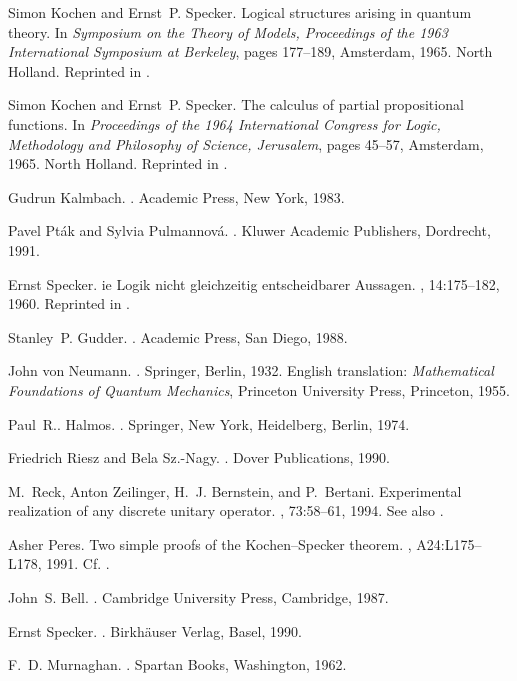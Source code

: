 \begin{thebibliography}{10}
Simon Kochen and Ernst~P. Specker.
\newblock Logical structures arising in quantum theory.
\newblock In {\em Symposium on the Theory of Models, Proceedings of the 1963
  International Symposium at Berkeley}, pages 177--189, Amsterdam, 1965. North
  Holland.
\newblock Reprinted in \cite[pp. 209--221]{specker-ges}.

Simon Kochen and Ernst~P. Specker.
\newblock The calculus of partial propositional functions.
\newblock In {\em Proceedings of the 1964 International Congress for Logic,
  Methodology and Philosophy of Science, Jerusalem}, pages 45--57, Amsterdam,
  1965. North Holland.
\newblock Reprinted in \cite[pp. 222--234]{specker-ges}.

Gudrun Kalmbach.
.
\newblock Academic Press, New York, 1983.

Pavel Pt{\'{a}}k and Sylvia Pulmannov{\'{a}}.
.
\newblock Kluwer Academic Publishers, Dordrecht, 1991.

Ernst Specker.
ie {L}ogik nicht gleichzeitig entscheidbarer {A}ussagen.
, 14:175--182, 1960.
\newblock Reprinted in \cite[pp. 175--182]{specker-ges}.

Stanley~P. Gudder.
.
\newblock Academic Press, San Diego, 1988.

John von Neumann.
.
\newblock Springer, Berlin, 1932.
\newblock English translation: {\sl Mathematical Foundations of Quantum
  Mechanics}, Princeton University Press, Princeton, 1955.

Paul~R.. Halmos.
.
\newblock Springer, New York, Heidelberg, Berlin, 1974.

Friedrich Riesz and Bela Sz.-Nagy.
.
\newblock Dover Publications, 1990.

M.~Reck, Anton Zeilinger, H.~J. Bernstein, and P.~Bertani.
\newblock Experimental realization of any discrete unitary operator.
, 73:58--61, 1994.
\newblock See also \cite{murnaghan}.

Asher Peres.
\newblock Two simple proofs of the {K}ochen--{S}pecker theorem.
, A24:L175--L178, 1991.
\newblock Cf. \cite[pp. 186-200]{peres}.

John~S. Bell.
.
\newblock Cambridge University Press, Cambridge, 1987.

Ernst Specker.
.
\newblock Birkh{\"{a}}user Verlag, Basel, 1990.

F.~D. Murnaghan.
.
\newblock Spartan Books, Washington, 1962.

\end{thebibliography}

%
%
%


